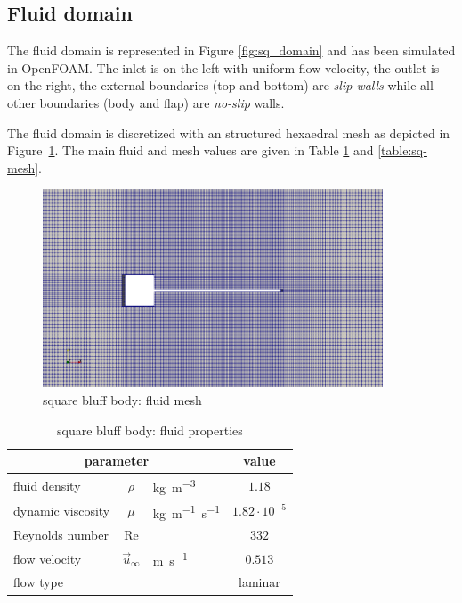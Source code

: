 \subsection{Fluid domain}

The fluid domain is represented in Figure \ref{fig:sq_domain} and has been simulated in OpenFOAM. The inlet is on the left with uniform flow velocity, the outlet is on the right, the external boundaries (top and bottom) are \textit{slip-walls} while all other boundaries (body and flap) are \textit{no-slip} walls.


The fluid domain is discretized with an structured hexaedral mesh as depicted in Figure~\ref{fig:sq_mesh}. The main fluid and mesh values are given in Table \ref{table:sq-fluid} and \ref{table:sq-mesh}. 

\begin{figure}[htbp!]
	\centering
	\includegraphics[width=0.9\textwidth]{images/sq-cyl/sq_mesh.png}
	\caption{square bluff body: fluid mesh}
	\label{fig:sq_mesh}
\end{figure}


\begin{table}[!htb]
	\begin{center}
		\begin{tabular}{ l c l | c } 
			\multicolumn{3}{c|}{parameter} & value  \\ 
			\hline
			fluid density  & $\rho$ & \si{kg.m^{-3}} & $1.18$   \\
			dynamic viscosity & $\mu$& \si{kg.m^{-1}.s^{-1}} & $1.82 \cdot 10^{-5}$  \\
			Reynolds number & Re &  & $332$ \\
			flow velocity & $\vec{u}_{\infty}$ & \si{m.s^{-1}} & $0.513$ \\
			flow type & & & laminar \\
		\end{tabular}
	\end{center}
	\caption{square bluff body: fluid properties}
	\label{table:sq-fluid}
\end{table}



